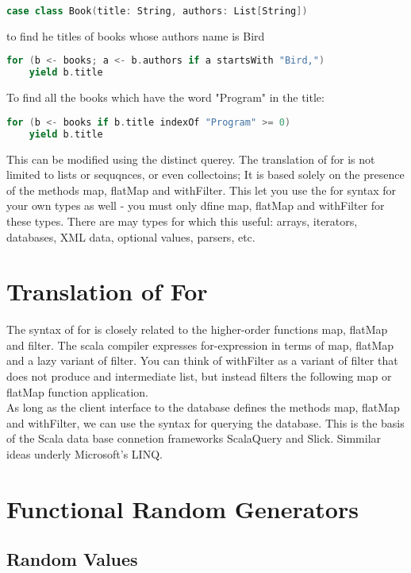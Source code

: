 \documentclass[10pt, a4paper]{report}
\begin{document}
\begin{lstlisting}[language=scala]
	case class Book(title: String, authors: List[String])
\end{lstlisting}

to find he titles of books whose authors name is Bird

\begin{lstlisting}[language=scala]
	for (b <- books; a <- b.authors if a startsWith "Bird,")
	yield b.title
\end{lstlisting}

To find all the books which have the word "Program" in the title:

\begin{lstlisting}[language=scala]
	for (b <- books if b.title indexOf "Program" >= 0)
	yield b.title
\end{lstlisting}

This can be modified using the distinct querey. The translation of for is not limited to lists or sequqnces, or even collectoins; It is based solely on the presence of the methods map, flatMap and withFilter. This let you use the for syntax for your own types as well - you must only dfine map, flatMap and withFilter for these types. There are may types for which this useful: arrays, iterators, databases, XML data, optional values, parsers, etc.

\section{Translation of For}

The syntax of for is closely related to the higher-order functions map, flatMap and filter. The scala compiler expresses for-expression in terms of map, flatMap and a lazy variant of filter. You can think of withFilter as a variant of filter that does not produce and intermediate list, but instead filters the following map or flatMap function application.\\ As long as the client interface to the database defines the methods map, flatMap and withFilter, we can use the syntax for querying the database. This is the basis of the Scala data base connetion frameworks ScalaQuery and Slick. Simmilar ideas underly Microsoft's LINQ.

\section{Functional Random Generators}

\subsection*{Random Values} 
\end{document}
